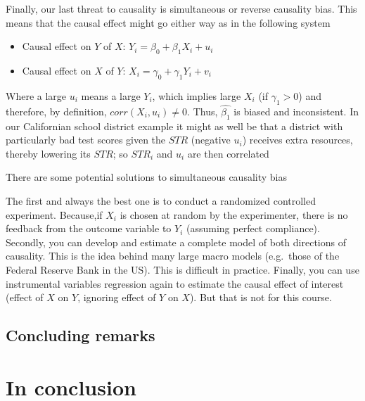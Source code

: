 \documentclass[
]{book}
\providecommand{\tightlist}{%
  \setlength{\itemsep}{0pt}\setlength{\parskip}{0pt}}
\begin{document}
Finally, our last threat to causality is simultaneous or reverse causality bias. This means that the causal effect might go either way as in the following system

\begin{itemize}
\tightlist
\item
  Causal effect on \(Y\) of \(X\): \(Y_i = \beta_0 + \beta_1 X_i + u_i\)
\item
  Causal effect on \(X\) of \(Y\): \(X_i = \gamma_0 + \gamma_1 Y_i + v_i\)
\end{itemize}

Where a large \(u_i\) means a large \(Y_i\), which implies large \(X_i\) (if \(\gamma_1>0\)) and therefore, by definition, \(corr(X_i,u_i) \neq 0\). Thus, \(\hat{\beta_1}\) is biased and inconsistent. In our Californian school district example it might as well be that a district with particularly bad test scores given the \(STR\) (negative \(u_i\)) receives extra resources, thereby lowering its \(STR\); so \(STR_i\) and \(u_i\) are then correlated

There are some potential solutions to simultaneous causality bias

The first and always the best one is to conduct a randomized controlled experiment. Because,if \(X_i\) is chosen at random by the experimenter, there is no feedback from the outcome variable to \(Y_i\) (assuming perfect compliance). Secondly, you can develop and estimate a complete model of both directions of causality. This is the idea behind many large macro models (e.g.~those of the Federal Reserve Bank in the US). This is difficult in practice. Finally, you can use instrumental variables regression again to estimate the causal effect of interest (effect of \(X\) on \(Y\), ignoring effect of \(Y\) on \(X\)). But that is not for this course.

\hypertarget{sec:conclusionspec}{%
\section{Concluding remarks}\label{sec:conclusionspec}}

\hypertarget{in-conclusion}{%
\chapter{In conclusion}\label{in-conclusion}}
\end{document}
